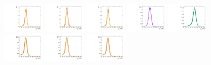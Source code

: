 \begin{figure}[htbp]
  \centering
  \includegraphics[width=0.18\textwidth]{fig/analysisAppendix/templateSignalVsMX_fromDC_GbuToWW_MJJ_mu_HP_bb_HDy.pdf}
  \includegraphics[width=0.18\textwidth]{fig/analysisAppendix/templateSignalVsMX_fromDC_RadToWW_MJJ_mu_HP_bb_HDy.pdf}
  \includegraphics[width=0.18\textwidth]{fig/analysisAppendix/templateSignalVsMX_fromDC_ZprToWW_MJJ_mu_HP_bb_HDy.pdf}
  \includegraphics[width=0.18\textwidth]{fig/analysisAppendix/templateSignalVsMX_fromDC_WprToWZ_MJJ_mu_HP_bb_HDy.pdf}
  \includegraphics[width=0.18\textwidth]{fig/analysisAppendix/templateSignalVsMX_fromDC_WprToWH_MJJ_mu_HP_bb_HDy.pdf}\\
  \includegraphics[width=0.18\textwidth]{fig/analysisAppendix/templateSignalVsMX_fromDC_GbuToWW_MJJ_mu_LP_bb_HDy.pdf}
  \includegraphics[width=0.18\textwidth]{fig/analysisAppendix/templateSignalVsMX_fromDC_RadToWW_MJJ_mu_LP_bb_HDy.pdf}
  \includegraphics[width=0.18\textwidth]{fig/analysisAppendix/templateSignalVsMX_fromDC_ZprToWW_MJJ_mu_LP_bb_HDy.pdf}

\end{figure}
